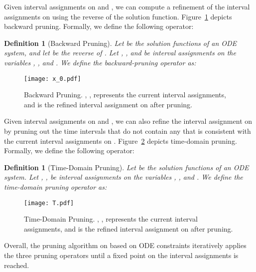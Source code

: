 \documentclass[12pt]{article}
\newtheorem{definition}[theorem]{Definition}
\begin{document}
\begin{algorithm}\label{alg:ForwardP}
\caption{}\label{forward}
\begin{algorithmic}[1]
  \State \;
  \State \;
  \While{}
      \State 
      \State 
  \EndWhile
  \State \Return{}
\end{algorithmic}
\end{algorithm}

 Given interval assignments on  and , we can compute a refinement of the interval assignments on  using the reverse of the solution function. Figure~\ref{x0p} depicts backward pruning. Formally, we define the following operator:
\begin{definition}[Backward Pruning]
Let  be the solution functions of an ODE system, and let  be the reverse of . Let , , and  be interval assignments on the variables , , and . We define the backward-pruning operator as:

\end{definition}
\begin{figure}
\begin{center}
\texttt{[image: x\_0.pdf]}
\end{center}
\caption{Backward Pruning. , ,  represents the current interval assignments, and  is the refined interval assignment on  after pruning.
}\label{x0p}
\end{figure}


 Given interval assignments on  and , we can also refine the interval assignment on  by pruning out the time intervals that do not contain any  that is consistent with the current interval assignments on . Figure~\ref{tp} depicts time-domain pruning. Formally, we define the following operator:
\begin{definition}[Time-Domain Pruning]
Let  be the solution functions of an ODE system. Let , ,  be interval assignments on the variables , , and . We define the time-domain pruning operator as:


\end{definition}
\begin{figure}
\begin{center}
\texttt{[image: T.pdf]}
\end{center}
\caption{Time-Domain Pruning.
 , ,  represents the current interval assignments, and  is the refined interval assignment on  after pruning.
}\label{tp}
\end{figure}

Overall, the pruning algorithm on based on ODE constraints iteratively applies the three pruning operators until a fixed point on the interval assignments is reached.
\end{document}
